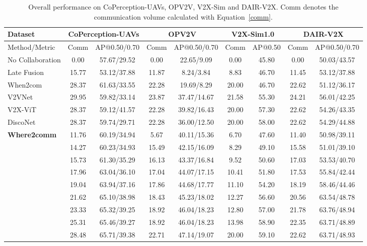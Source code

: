 \documentclass{article}
\begin{document}
\begin{table}[!t]
\setlength\tabcolsep{2pt}
\caption{Overall performance on CoPerception-UAVs, OPV2V, V2X-Sim and DAIR-V2X. Comm denotes the communication volume calculated with Equation~\eqref{comm}.}
\begin{small}
\centering
\begin{tabular}{l|cc|cc|cc|cc}
\hline
Dataset                              & \multicolumn{2}{c|}{CoPerception-UAVs}          & \multicolumn{2}{c|}{OPV2V}                      & \multicolumn{2}{c|}{V2X-Sim1.0}          & \multicolumn{2}{c}{DAIR-V2X} \\ \hline
Method/Metric                        & Comm  & AP@0.50/0.70 & Comm  & AP@0.50/0.70 & Comm  & AP@0.50 & Comm   & AP@0.50/0.70  \\ \hline
No Collaboration                              & 0.00     & 57.67/29.52   & 0.00     & 22.65/9.09    & 0.00     &45.80   & 0.00      & 50.03/43.57    \\
Late Fusion                          & 15.77 & 53.12/37.88   & 11.87 & 8.24/3.84    & 8.83 &46.70   & 11.45  & 53.12/37.88    \\
When2com                             & 28.37 & 61.63/33.55   & 22.28 & 19.69/8.29    & 20.00 &46.70  & 22.62  & 51.12/36.17    \\
V2VNet                               & 29.95 & 59.82/33.14   & 23.87 & 37.47/14.67   & 21.58 &55.30   & 24.21  & 56.01/42.25    \\
V2X-ViT                              & 28.37 & 59.12/41.57   & 22.28 & 39.82/16.43   & 20.00 &57.30   & 22.62  & 54.26/43.35    \\
DiscoNet                             & 28.37 & 59.74/29.71   & 22.28 & 36.00/12.50   & 20.00 &58.00   & 22.62  & 54.29/44.88    
\\\hline
\multirow{9}{*}{\textbf{Where2comm}} &11.76 & 60.19/34.94    &5.67 & 40.11/15.36     &6.70 & 47.60   &11.40 & 50.98/39.11    \\
&14.27 & 60.23/34.93    &15.49 & 42.15/16.09    &8.29 & 49.10   &15.58 & 51.01/39.10    \\
&15.73 & 61.30/35.29    &16.13 & 43.37/16.84    &9.52 & 50.60   &17.03 & 53.53/40.70    \\
&17.96 & 63.04/36.10    &17.04 & 44.07/17.15    &10.41 & 51.80  &17.53 & 55.84/42.44    \\
&19.04 & 63.94/37.16    &17.86 & 44.68/17.77    &11.10 & 54.20  &18.19 & 58.46/44.46    \\
&21.62 & 65.10/38.98    &18.43 & 45.23/18.02    &12.27 & 56.60  &20.56 & 63.54/48.78    \\
&23.33 & 65.32/39.25    &18.92 & 46.04/18.23    &12.80 & 57.00  &21.78 & 63.76/48.94    \\
&25.31 & 65.46/39.27    &18.92 & 46.04/18.23    &13.98 & 58.90  &22.35 & 63.71/48.89    \\
&28.48 & 65.71/39.38    &22.71 & 47.14/19.07    &20.00 &59.10    &22.62 & 63.71/48.93    \\\hline 
\end{tabular}
\end{small}
\label{tab:performance}
\vspace{-5mm}
\end{table}
\end{document}
